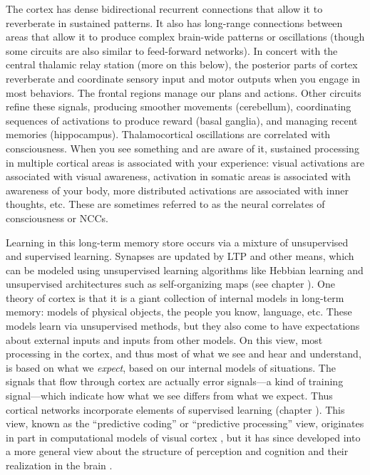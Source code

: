 The cortex has dense bidirectional recurrent connections that allow it to reverberate in sustained patterns. It  also has long-range connections between areas that allow it to produce complex brain-wide patterns or oscillations (though some circuits are also similar to feed-forward networks). In concert with the central thalamic relay station (more on this below), the posterior parts of cortex reverberate and coordinate sensory input and motor outputs when you engage in most behaviors. The frontal regions manage our plans and actions. Other circuits refine these signals, producing smoother movements (cerebellum), coordinating sequences of activations to produce reward (basal ganglia), and managing recent memories (hippocampus). Thalamocortical oscillations are correlated with consciousness. When you see something and are aware of it,  sustained processing in multiple cortical areas is  associated with your experience: visual activations are associated with visual awareness, activation in somatic areas is associated with awareness of your body, more distributed activations are associated with inner thoughts, etc. These are sometimes referred to as the neural correlates of consciousness or NCCs.

Learning in this long-term memory store occurs via a mixture of unsupervised and supervised learning. Synapses are updated by LTP and other means,  which can be modeled using unsupervised learning algorithms like Hebbian learning and unsupervised architectures such as self-organizing maps (see chapter ). One theory of cortex is that it is a giant collection of internal models in long-term memory: models of physical objects, the people you know, language, etc. These models learn via unsupervised methods, but they also come to have expectations about external inputs and inputs from other models. On this view, most processing in the cortex, and thus most of what we see and hear and understand, is based on what we \emph{expect}, based on our internal models of situations. The signals that flow through cortex are actually error signals---a kind of training signal---which  indicate how what we see differs from what we expect. Thus cortical networks incorporate elements of supervised learning (chapter ). This view, known as the ``predictive coding'' or ``predictive processing'' view, originates in part in computational models of visual cortex \cite{rao1999predictive}, but it has since developed into a more general view about the structure of perception and cognition and their realization in the brain \cite{clark2013whatever}.


